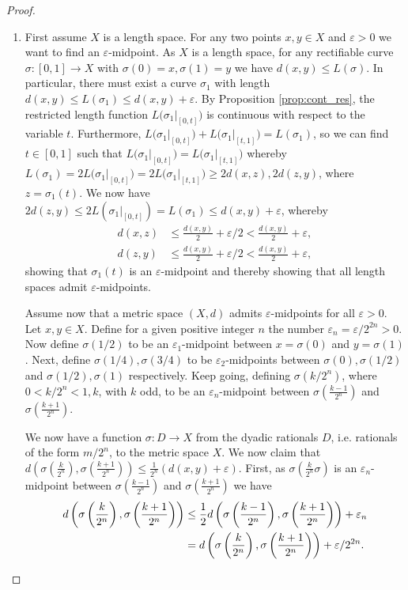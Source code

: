 \documentclass[11pt, a4paper, oneside]{memoir}
\theoremstyle{plain}\newtheorem{theorem}[subsection]{Theorem}
\theoremstyle{definition}
\newcommand{\parenum}{\setenumerate[1]{label=\textbf{(\arabic*)}}}
\newcommand{\length}[2][\sigma]{\left.L(#1\right|_{#2})}
\begin{document}
\begin{proof}
\parenum
\begin{enumerate}
    \item First assume \(X\) is a length space.
For any two points \(x,y\in X\) and \(\varepsilon>0\) we want to find an \(\varepsilon\)-midpoint.
As \(X\) is a length space, for any rectifiable curve \(\sigma:[0,1]\to X\) with \(\sigma(0)=x,\sigma(1)=y\) we have \(d(x,y)\leq L(\sigma)\).
In particular, there must exist a curve \(\sigma_1\) with length \(d(x,y)\leq L(\sigma_1)\leq d(x,y)+\varepsilon\).
By Proposition \ref{prop:cont_res}, the restricted length function \(\length[\sigma_1]{[0,t]}\) is continuous with respect to the variable \(t\).
Furthermore, \(\length[\sigma_1]{[0,t]}+\length[\sigma_1]{[t,1]}=L(\sigma_1)\), so we can find \(t\in [0,1]\) such that \(\length[\sigma_1]{[0,t]}=\length[\sigma_1]{[t,1]}\) whereby \(L(\sigma_1)=2\length[\sigma_1]{[0,t]}=2\length[\sigma_1]{[t,1]}\geq 2d(x,z), 2d(z,y)\), where \(z=\sigma_1(t)\).
We now have \(2d(z,y)\leq 2L(\sigma_1|_{[0,t]})=L(\sigma_1)\leq d(x,y)+\varepsilon\), whereby 
\begin{align*}
    d(x,z)&\leq\frac{d(x,y)}{2}+\varepsilon/2<\frac{d(x,y)}{2}+\varepsilon,\\
    d(z,y)&\leq\frac{d(x,y)}{2}+\varepsilon/2<\frac{d(x,y)}{2}+\varepsilon,
\end{align*}
showing that \(\sigma_1(t)\) is an \(\varepsilon\)-midpoint and thereby showing that all length spaces admit \(\varepsilon\)-midpoints.

Assume now that a metric space \((X,d)\) admits \(\varepsilon\)-midpoints for all \(\varepsilon>0\).
Let \(x,y\in X\).
Define for a given positive integer \(n\) the number \(\varepsilon_n=\varepsilon/2^{2n}>0\).
Now define \(\sigma(1/2)\) to be an \(\varepsilon_1\)-midpoint between \(x=\sigma(0)\) and \(y=\sigma(1)\).
Next, define \(\sigma(1/4),\sigma(3/4)\) to be \(\varepsilon_2\)-midpoints between \(\sigma(0),\sigma(1/2)\) and \(\sigma(1/2),\sigma(1)\) respectively.
Keep going, defining \(\sigma(k/2^n)\), where \(0<k/2^n<1, k\), with \(k\) odd, to be an \(\varepsilon_n\)-midpoint between \(\sigma\left(\frac{k-1}{2^n}\right)\) and \(\sigma\left(\frac{k+1}{2^n}\right)\).

We now have a function \(\sigma:D\to X\) from the dyadic rationals \(D\), i.e. rationals of the form \(m/2^n\), to the metric space \(X\).
We now claim that \(d\left(\sigma\left(\frac{k}{2^n}\right),\sigma\left(\frac{k+1}{2^{n}}\right)\right)\leq \frac{1}{2^n}(d(x,y)+\varepsilon)\).
First, as \(\sigma\left(\frac{k}{2^n}\sigma\right)\) is an \(\varepsilon_n\)-midpoint between \(\sigma\left(\frac{k-1}{2^n}\right)\) and \(\sigma\left(\frac{k+1}{2^n}\right)\) we have
\begin{align}
d\left(\sigma\left(\frac{k}{2^n}\right),\sigma\left(\frac{k+1}{2^n}\right)\right)
&\leq \frac{1}{2}d\left(\sigma\left(\frac{k-1}{2^n}\right),\sigma\left(\frac{k+1}{2^n}\right)\right)+\varepsilon_n\label{eq:mid1}\\
&=d\left(\sigma\left(\frac{k}{2^n}\right),\sigma\left(\frac{k+1}{2^n}\right)\right)+\varepsilon/2^{2n}.\notag
\end{align}


\end{enumerate}
\end{proof}
\end{document}
